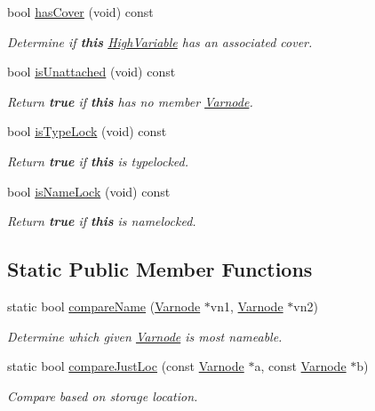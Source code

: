 \begin{DoxyCompactItemize}
bool \mbox{\hyperlink{class_high_variable_a7144f5f47bc8b53e9ea9f947e35f764a}{has\+Cover}} (void) const
\begin{DoxyCompactList}\small\item\em Determine if {\bfseries{this}} \mbox{\hyperlink{class_high_variable}{High\+Variable}} has an associated cover. \end{DoxyCompactList}\item 
bool \mbox{\hyperlink{class_high_variable_a55040c38f214b8352da5c735cb55c492}{is\+Unattached}} (void) const
\begin{DoxyCompactList}\small\item\em Return {\bfseries{true}} if {\bfseries{this}} has no member \mbox{\hyperlink{class_varnode}{Varnode}}. \end{DoxyCompactList}\item 
bool \mbox{\hyperlink{class_high_variable_a745952b13c07ec2abacf39fa2da8b3c6}{is\+Type\+Lock}} (void) const
\begin{DoxyCompactList}\small\item\em Return {\bfseries{true}} if {\bfseries{this}} is {\itshape typelocked}. \end{DoxyCompactList}\item 
bool \mbox{\hyperlink{class_high_variable_ab1047faa6d46804937017bee1ac15d25}{is\+Name\+Lock}} (void) const
\begin{DoxyCompactList}\small\item\em Return {\bfseries{true}} if {\bfseries{this}} is {\itshape namelocked}. \end{DoxyCompactList}\end{DoxyCompactItemize}
\subsection*{Static Public Member Functions}
\begin{DoxyCompactItemize}
\item 
static bool \mbox{\hyperlink{class_high_variable_ac6a775cce16963a8c0470f9a61ec3fcd}{compare\+Name}} (\mbox{\hyperlink{class_varnode}{Varnode}} $\ast$vn1, \mbox{\hyperlink{class_varnode}{Varnode}} $\ast$vn2)
\begin{DoxyCompactList}\small\item\em Determine which given \mbox{\hyperlink{class_varnode}{Varnode}} is most nameable. \end{DoxyCompactList}\item 
static bool \mbox{\hyperlink{class_high_variable_ae010dd1253fe67707a4f1357e6400cc0}{compare\+Just\+Loc}} (const \mbox{\hyperlink{class_varnode}{Varnode}} $\ast$a, const \mbox{\hyperlink{class_varnode}{Varnode}} $\ast$b)
\begin{DoxyCompactList}\small\item\em Compare based on storage location. \end{DoxyCompactList}\end{DoxyCompactItemize}
